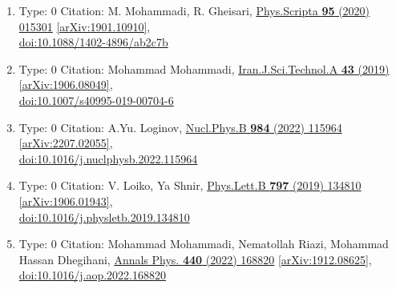 \documentclass[a4paper,10pt]{article}
\begin{document}
\begin{enumerate}
\begin{enumerate}
  \item Type: 0 Citation: M. Mohammadi, R. Gheisari, \href{https://www.doi.org/10.1088/1402-4896/ab2c7b}{Phys.Scripta {\bf 95} (2020) 015301}  \href{https://arxiv.org/abs/1901.10910}{[arXiv:1901.10910]},\\\href{https://www.doi.org/10.1088/1402-4896/ab2c7b}{doi:10.1088/1402-4896/ab2c7b}
  \item Type: 0 Citation: Mohammad Mohammadi, \href{https://www.doi.org/10.1007/s40995-019-00704-6}{Iran.J.Sci.Technol.A {\bf 43} (2019) }  \href{https://arxiv.org/abs/1906.08049}{[arXiv:1906.08049]},\\\href{https://www.doi.org/10.1007/s40995-019-00704-6}{doi:10.1007/s40995-019-00704-6}
  \item Type: 0 Citation: A.Yu. Loginov, \href{https://www.doi.org/10.1016/j.nuclphysb.2022.115964}{Nucl.Phys.B {\bf 984} (2022) 115964}  \href{https://arxiv.org/abs/2207.02055}{[arXiv:2207.02055]},\\\href{https://www.doi.org/10.1016/j.nuclphysb.2022.115964}{doi:10.1016/j.nuclphysb.2022.115964}
  \item Type: 0 Citation: V. Loiko, Ya Shnir, \href{https://www.doi.org/10.1016/j.physletb.2019.134810}{Phys.Lett.B {\bf 797} (2019) 134810}  \href{https://arxiv.org/abs/1906.01943}{[arXiv:1906.01943]},\\\href{https://www.doi.org/10.1016/j.physletb.2019.134810}{doi:10.1016/j.physletb.2019.134810}
  \item Type: 0 Citation: Mohammad Mohammadi, Nematollah Riazi, Mohammad Hassan Dhegihani, \href{https://www.doi.org/10.1016/j.aop.2022.168820}{Annals Phys. {\bf 440} (2022) 168820}  \href{https://arxiv.org/abs/1912.08625}{[arXiv:1912.08625]},\\\href{https://www.doi.org/10.1016/j.aop.2022.168820}{doi:10.1016/j.aop.2022.168820}

\end{enumerate}
\end{enumerate}
\end{document}
